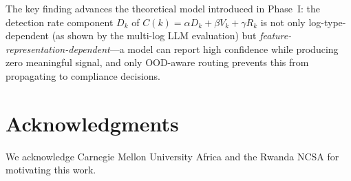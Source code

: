 \documentclass[11pt,conference]{IEEEtran}
\begin{document}
The key finding advances the theoretical model introduced in Phase~I: the
detection rate component $D_k$ of $C(k) = \alpha D_k + \beta V_k + \gamma
R_k$ is not only log-type-dependent (as shown by the multi-log LLM
evaluation) but \emph{feature-representation-dependent}---a model can report
high confidence while producing zero meaningful signal, and only OOD-aware
routing prevents this from propagating to compliance decisions.

\section*{Acknowledgments}
We acknowledge Carnegie Mellon University Africa and the Rwanda NCSA for
motivating this work.
\end{document}
